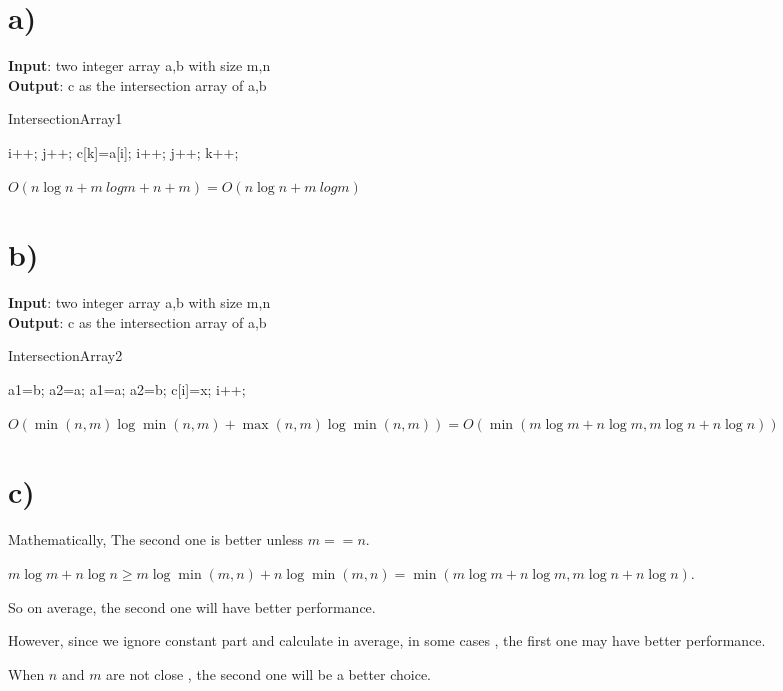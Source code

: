 \documentclass[11pt]{exam}
\begin{document}
\newpage
\begin{solution}
    \section*{a)}
    \begin{algorithm}[H]
        \textbf{Input}: two integer array a,b with size m,n\\
        \textbf{Output}: c as the intersection array of a,b
        \caption{IntersectionArray1}
        \begin{algorithmic}[1]
                \State i++;
            \Else
                    \State j++;
                \Else
                    \State c[k]=a[i];
                    \State i++;
                    \State  j++;
                    \State   k++;
                \EndIf
            \EndIf
            \EndWhile
        \end{algorithmic}
    \end{algorithm}
    $O(n\log n + m\ log m +n+m)=O(n\log n + m\ log m)$
    \section*{b)}
    \begin{algorithm}[H]
        \textbf{Input}: two integer array a,b with size m,n\\
        \textbf{Output}: c as the intersection array of a,b
        \caption{IntersectionArray2}
        \begin{algorithmic}[1]
                \State *a1=b;
                \State *a2=a;
            \Else
                \State *a1=a;
                \State *a2=b;
            \EndIf
                \State c[i]=x;
                \State i++;
            \EndIf
            \EndFor
        \end{algorithmic}
    \end{algorithm}
    $O(\min (n,m) \log \min (n,m) + \max (n,m) \log \min (n,m))=O(\min(m\log m + n \log m, m \log n + n \log n))$
\section*{c)}
Mathematically, The second one is better unless $m==n$.

$m\log m + n\log n \geq m \log \min (m,n)+n \log \min (m,n) = \min ( m \log m + n\log m, m \log n +n \log n)  $.

So on average, the second one will have better performance.

However, since we ignore constant part and calculate in average, in some cases , the first one may have better performance.

When $n$ and $m$ are not close , the second one will be a better choice.

\end{solution}
\end{document}
